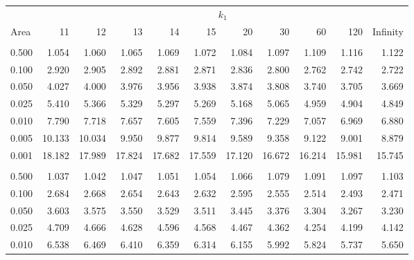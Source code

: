 \documentclass[
]{article}
\begin{document}
\begin{longtable}[t]{lrrrrrrrrrr}
\toprule
\multicolumn{1}{c}{ } & \multicolumn{10}{c}{$k_1$} \\
\cmidrule(l{3pt}r{3pt}){2-11}
Area & 11 & 12 & 13 & 14 & 15 & 20 & 30 & 60 & 120 & Infinity\\
\midrule
\addlinespace[0.3em]
\multicolumn{11}{l}{\textbf{$k_2=6$}}\\
\hspace{1em}0.500 & 1.054 & 1.060 & 1.065 & 1.069 & 1.072 & 1.084 & 1.097 & 1.109 & 1.116 & 1.122\\
\hspace{1em}0.100 & 2.920 & 2.905 & 2.892 & 2.881 & 2.871 & 2.836 & 2.800 & 2.762 & 2.742 & 2.722\\
\hspace{1em}0.050 & 4.027 & 4.000 & 3.976 & 3.956 & 3.938 & 3.874 & 3.808 & 3.740 & 3.705 & 3.669\\
\hspace{1em}0.025 & 5.410 & 5.366 & 5.329 & 5.297 & 5.269 & 5.168 & 5.065 & 4.959 & 4.904 & 4.849\\
\hspace{1em}0.010 & 7.790 & 7.718 & 7.657 & 7.605 & 7.559 & 7.396 & 7.229 & 7.057 & 6.969 & 6.880\\
\hspace{1em}0.005 & 10.133 & 10.034 & 9.950 & 9.877 & 9.814 & 9.589 & 9.358 & 9.122 & 9.001 & 8.879\\
\hspace{1em}0.001 & 18.182 & 17.989 & 17.824 & 17.682 & 17.559 & 17.120 & 16.672 & 16.214 & 15.981 & 15.745\\
\addlinespace[0.3em]
\multicolumn{11}{l}{\textbf{$k_2=7$}}\\
\hspace{1em}0.500 & 1.037 & 1.042 & 1.047 & 1.051 & 1.054 & 1.066 & 1.079 & 1.091 & 1.097 & 1.103\\
\hspace{1em}0.100 & 2.684 & 2.668 & 2.654 & 2.643 & 2.632 & 2.595 & 2.555 & 2.514 & 2.493 & 2.471\\
\hspace{1em}0.050 & 3.603 & 3.575 & 3.550 & 3.529 & 3.511 & 3.445 & 3.376 & 3.304 & 3.267 & 3.230\\
\hspace{1em}0.025 & 4.709 & 4.666 & 4.628 & 4.596 & 4.568 & 4.467 & 4.362 & 4.254 & 4.199 & 4.142\\
\hspace{1em}0.010 & 6.538 & 6.469 & 6.410 & 6.359 & 6.314 & 6.155 & 5.992 & 5.824 & 5.737 & 5.650\\

\end{longtable}
\end{document}
